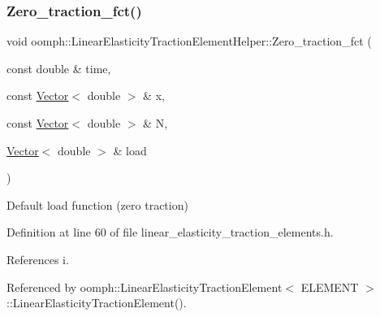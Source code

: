 \subsubsection{\texorpdfstring{Zero\+\_\+traction\+\_\+fct()}{Zero\_traction\_fct()}}
{\footnotesize\ttfamily void oomph\+::\+Linear\+Elasticity\+Traction\+Element\+Helper\+::\+Zero\+\_\+traction\+\_\+fct (\begin{DoxyParamCaption}\item[{const double \&}]{time,  }\item[{const \hyperlink{classoomph_1_1Vector}{Vector}$<$ double $>$ \&}]{x,  }\item[{const \hyperlink{classoomph_1_1Vector}{Vector}$<$ double $>$ \&}]{N,  }\item[{\hyperlink{classoomph_1_1Vector}{Vector}$<$ double $>$ \&}]{load }\end{DoxyParamCaption})}



Default load function (zero traction) 



Definition at line 60 of file linear\+\_\+elasticity\+\_\+traction\+\_\+elements.\+h.



References i.



Referenced by oomph\+::\+Linear\+Elasticity\+Traction\+Element$<$ E\+L\+E\+M\+E\+N\+T $>$\+::\+Linear\+Elasticity\+Traction\+Element().

